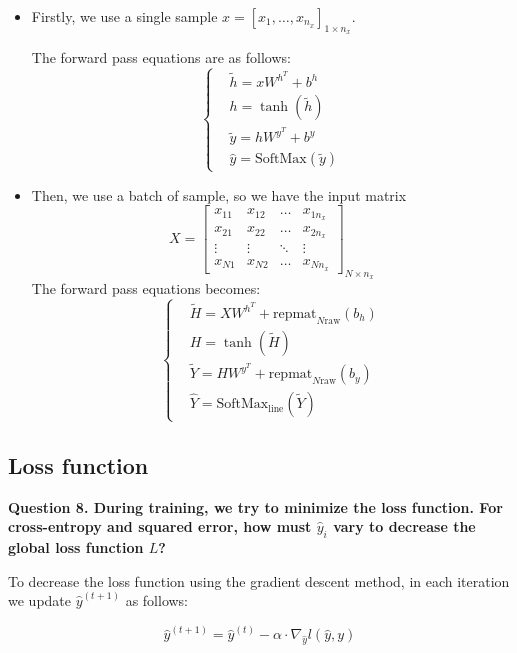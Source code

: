 \documentclass{article}
\begin{document}
\begin{itemize}
    \item Firstly, we use a single sample \(x = [x_1, \dots, x_{n_x}]_{1 \times n_x}\).
    
    The forward pass equations are as follows:
    \[
    \left\{
    \begin{aligned}
        & \tilde{h} = xW^{h^T} + b^h \\
        & h = \tanh(\tilde{h}) \\
        & \tilde{y} = hW^{y^T} + b^y \\
        & \hat{y} = \text{SoftMax}(\tilde{y})
    \end{aligned}
    \right.
    \]
    \item Then, we use a batch of sample, so we have the input matrix
    \[
    X = 
    \begin{bmatrix}
    x_{11} & x_{12} & \dots & x_{1n_x} \\
    x_{21} & x_{22} & \dots & x_{2n_x} \\
    \vdots & \vdots & \ddots & \vdots \\
    x_{N1} & x_{N2} & \dots & x_{Nn_x}
    \end{bmatrix}_{N \times n_x}
    \]
    The forward pass equations becomes:
    \[
    \left\{
    \begin{aligned}
        & \tilde{H} = X W^{h^T} + \text{repmat}_{N \text{raw}}(b_h) \\
        & H = \tanh(\tilde{H}) \\
        & \tilde{Y} = H W^{y^T} + \text{repmat}_{N \text{raw}}(b_y) \\
        & \hat{Y} = \text{SoftMax}_{\text{line}}(\tilde{Y})
    \end{aligned}
    \right.
    \]
\end{itemize}

\subsection{Loss function}

\noindent \textbf{Question 8. During training, we try to minimize the loss function. For cross-entropy and squared error, how must \(\hat{y}_i\) vary to decrease the global loss function \(L\)?}

To decrease the loss function using the gradient descent method, in each iteration we update \(\hat{y}^{(t+1)}\) as follows:

\[
\hat{y}^{(t+1)} = \hat{y}^{(t)} - \alpha \cdot \nabla_{\hat{y}} l(\hat{y}, y)
\]
\end{document}
